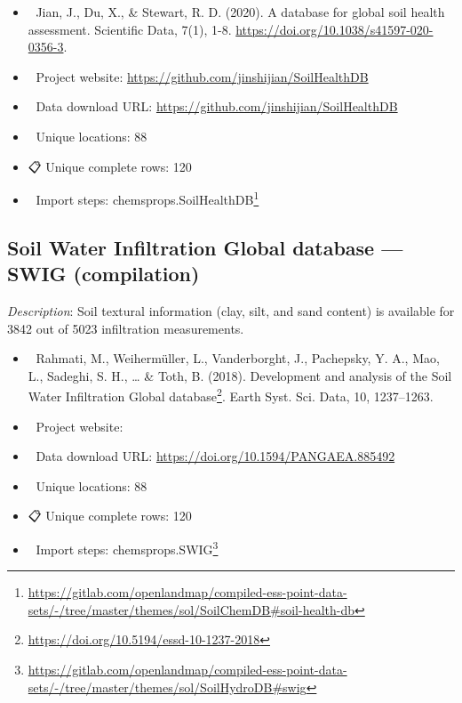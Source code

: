 \documentclass[
  graybox,natbib,nospthms]{svmono}
\providecommand{\tightlist}{%
  \setlength{\itemsep}{0pt}\setlength{\parskip}{0pt}}
\providecommand{\tightlist}{\setlength{\itemsep}{0pt}\setlength{\parskip}{0pt}}
\renewcommand{\href}[2]{#2 (\url{#1})}
\renewcommand{\href}[2]{#2\footnote{\url{#1}}}
\begin{document}
\begin{itemize}
\tightlist
\item
  📕 Jian, J., Du, X., \& Stewart, R. D. (2020). A database for global soil health assessment. Scientific Data, 7(1), 1-8. \url{https://doi.org/10.1038/s41597-020-0356-3}.\\
\item
  🔗 Project website: \url{https://github.com/jinshijian/SoilHealthDB}\\
\item
  📂 Data download URL: \url{https://github.com/jinshijian/SoilHealthDB}\\
\item
  📍 Unique locations: 88\\
\item
  📋 Unique complete rows: 120\\
\item
  📝 Import steps: \href{https://gitlab.com/openlandmap/compiled-ess-point-data-sets/-/tree/master/themes/sol/SoilChemDB\#soil-health-db}{chemsprops.SoilHealthDB}
\end{itemize}

\hypertarget{soil-water-infiltration-global-database-swig-compilation}{%
\subsection{Soil Water Infiltration Global database --- SWIG (compilation)}\label{soil-water-infiltration-global-database-swig-compilation}}

\emph{Description}: Soil textural information (clay, silt, and sand content) is available for 3842 out of 5023 infiltration measurements.

\begin{itemize}
\tightlist
\item
  📕 Rahmati, M., Weihermüller, L., Vanderborght, J., Pachepsky, Y. A.,
  Mao, L., Sadeghi, S. H., \ldots{} \& Toth, B. (2018). \href{https://doi.org/10.5194/essd-10-1237-2018}{Development and analysis of the Soil Water Infiltration Global database}. Earth Syst. Sci. Data, 10, 1237--1263.\\
\item
  🔗 Project website:\\
\item
  📂 Data download URL: \url{https://doi.org/10.1594/PANGAEA.885492}\\
\item
  📍 Unique locations: 88\\
\item
  📋 Unique complete rows: 120\\
\item
  📝 Import steps: \href{https://gitlab.com/openlandmap/compiled-ess-point-data-sets/-/tree/master/themes/sol/SoilHydroDB\#swig}{chemsprops.SWIG}
\end{itemize}
\end{document}
